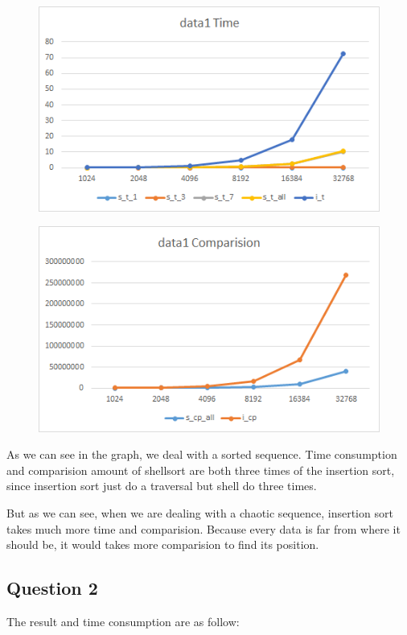 \documentclass[conference]{IEEEtran}
\begin{document}
\begin{figure}[H]
    \centerline{\includegraphics[scale=0.65]{Pic/pic2.png}}
\end{figure}

\begin{figure}[H]
    \centerline{\includegraphics[scale=0.65]{Pic/pic4.png}}
\end{figure}

As we can see in the graph, we deal with a sorted sequence. Time consumption 
and comparision amount of shellsort are both three times of the insertion sort,
since insertion sort just do a traversal but shell do three times.

But as we can see, when we are dealing with a chaotic sequence, insertion sort 
takes much more time and comparision. Because every data is far from where it 
should be, it would takes more comparision to find its position.

\subsection*{Question 2}
The result and time consumption are as follow:
\end{document}
